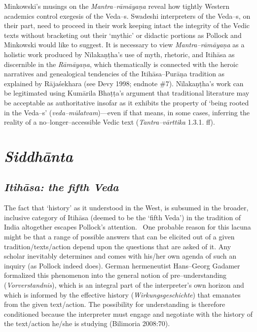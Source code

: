 Minkowski’s musings on the \textit{Mantra–rāmāyaṇa} reveal how tightly Western academics control exegesis of the Veda–s. Swadeshi interpreters of the Veda–s, on their part, need to proceed in their work keeping intact the integrity of the Vedic texts without bracketing out their ‘mythic’ or didactic portions as Pollock and Minkowski would like to suggest. It is necessary to view \textit{Mantra–rāmāyaṇa} as a holistic work produced by Nīlakaṇṭha’s use of myth, rhetoric, and Itihāsa as discernible in the \textit{Rāmāyaṇa}, which thematically is connected with the heroic narratives and genealogical tendencies of the Itihāsa–Purāṇa tradition as explained by Rājaśekhara (see Devy 1998; endnote \#7). Nīlakaṇṭha’s work can be legitimated using Kumārila Bhaṭṭa’s argument that traditional literature may be acceptable as authoritative insofar as it exhibits the property of ‘being rooted in the Veda–s’ (\textit{veda–mūlatvam})—even if that means, in some cases, inferring the reality of a no–longer–accessible Vedic text (\textit{Tantra–vārttika} 1.3.1. ff).


\section*{\textit{Siddhānta}}

\subsection*{\textit{Itihāsa: the fifth Veda}}

The fact that ‘history’ as it understood in the West, is subsumed in the broader, inclusive category of Itihāsa (deemed to be the ‘fifth Veda’) in the tradition of India altogether escapes Pollock’s attention.  One probable reason for this lacuna might be that a range of possible answers that can be elicited out of a given tradition/texts/action depend upon the questions that are asked of it. Any scholar inevitably determines and comes with his/her own agenda of such an inquiry (as Pollock indeed does). German hermeneutist Hans–Georg Gadamer formalized this phenomenon into the general notion of pre–understanding (\textit{Vorverstandnis}), which is an integral part of the interpreter’s own horizon and which is informed by the effective history (\textit{Wirkungsgeschichte}) that emanates from the given text/action. The possibility for understanding is therefore conditioned because the interpreter must engage and negotiate with the history of the text/action he/she is studying (Bilimoria 2008:70). 

